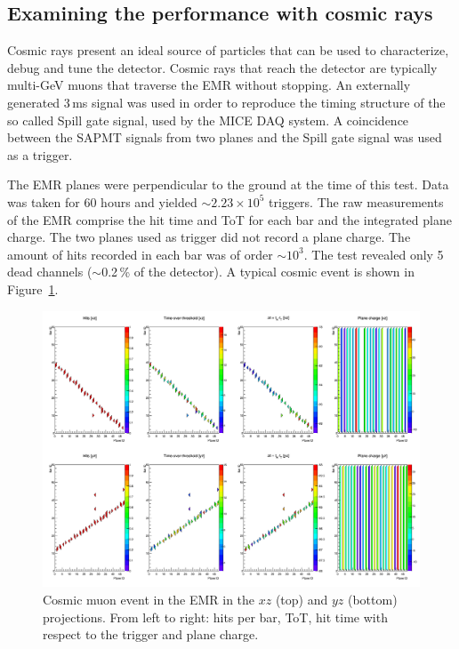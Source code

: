 \documentclass[a4paper,11pt]{article}
\begin{document}
\subsection{Examining the performance with cosmic rays}\label{sec:cosmic_perf}
Cosmic rays present an ideal source of particles that can be used to characterize, debug and tune the detector. Cosmic rays that reach the detector are
typically multi-GeV muons that traverse the EMR without stopping. An externally generated 3\,ms signal was used in order to reproduce the timing structure
of the so called Spill gate signal, used by the MICE DAQ system. A coincidence between the SAPMT signals from two planes and the Spill gate signal was used
as a trigger.

The EMR planes were perpendicular to the ground at the time of this test. Data was taken for 60 hours and yielded $\sim2.23\times10^5$ triggers. The raw
measurements of the EMR comprise the hit time and ToT for each bar and the integrated plane charge. The two planes used as trigger did not record a plane
charge. The amount of hits recorded in each bar was of order $\sim10^3$.  The test revealed only 5 dead channels ($\sim$0.2\,\% of the detector). A typical
cosmic event is shown in Figure~\ref{fig:cosmic_muon}. 

\begin{figure}[!htr]
\centering
\includegraphics[width=\textwidth]{cosmic_event.png}
\caption{Cosmic muon event in the EMR in the $xz$ (top) and $yz$ (bottom) projections. From left to right: hits per bar, ToT, hit time
with respect to the trigger and plane charge.}
\label{fig:cosmic_muon}
\end{figure}
\end{document}
